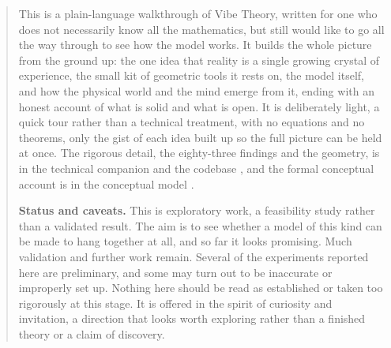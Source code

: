 \begin{abstract}
This is a plain-language walkthrough of Vibe Theory, written for one who does not necessarily know all the mathematics,
but still would like to go all the way through to see how the model works.
It builds the whole picture from the ground up: the one idea that
reality is a single growing crystal of experience, the small kit of geometric tools it rests on,
the model itself, and how the physical world and the mind emerge from it, ending with an honest
account of what is solid and what is open. It is deliberately light, a quick tour rather than a
technical treatment, with no equations and no theorems, only the gist of each idea built up so the
full picture can be held at once. The rigorous detail, the eighty-three findings and the geometry,
is in the technical companion \cite{pollard2026techcompanion} and the codebase
\cite{pollard2026vibetest}, and the formal conceptual account is in the conceptual model
\cite{pollard2026vibeconcept}.
\medskip

\noindent\textbf{Status and caveats.} This is exploratory work, a feasibility study rather than a validated result. The aim is to see whether a model of this kind can be made to hang together at all, and so far it looks promising. Much validation and further work remain. Several of the experiments reported here are preliminary, and some may turn out to be inaccurate or improperly set up. Nothing here should be read as established or taken too rigorously at this stage. It is offered in the spirit of curiosity and invitation, a direction that looks worth exploring rather than a finished theory or a claim of discovery.
\end{abstract}
